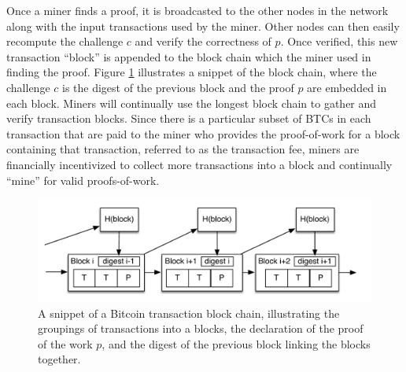 Once a miner finds a proof, it is broadcasted to the other nodes in the network along with the input transactions used by the miner. Other nodes can then easily recompute the challenge $c$ and verify the correctness of $p$. Once verified, this new transaction ``block'' is appended to the block chain which the miner used in finding the proof. Figure \ref{fig:block} illustrates a snippet of the block chain, where the challenge $c$ is the digest of the previous block and the proof $p$ are embedded in each block. Miners will continually use the longest block chain to gather and verify transaction blocks. Since there is a particular subset of BTCs in each transaction that are paid to the miner who provides the proof-of-work for a block containing that transaction, referred to as the transaction fee, miners are financially incentivized to collect more transactions into a block and continually ``mine'' for valid proofs-of-work. 

\begin{center}
\begin{figure}
\includegraphics[scale=0.5]{./images/transaction_block_pow.pdf}
\caption{A snippet of a Bitcoin transaction block chain, illustrating the groupings of transactions into a blocks, the declaration of the proof of the work $p$, and the digest of the previous block linking the blocks together.}
\label{fig:block}
\end{figure}
\end{center}


